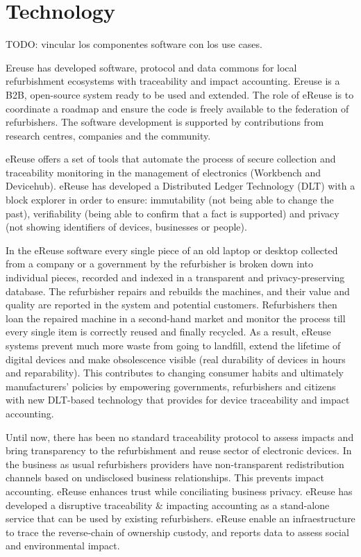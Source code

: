 \documentclass[
]{book}
\begin{document}
\hypertarget{technology}{%
\chapter{Technology}\label{technology}}

TODO: vincular los componentes software con los use cases.

Ereuse has developed software, protocol and data commons for local refurbishment ecosystems with traceability and impact accounting. Ereuse is a B2B, open-source system ready to be used and extended. The role of eReuse is to coordinate a roadmap and ensure the code is freely available to the federation of refurbishers. The software development is supported by contributions from research centres, companies and the community.

eReuse offers a set of tools that automate the process of secure collection and traceability monitoring in the management of electronics (Workbench and Devicehub). eReuse has developed a Distributed Ledger Technology (DLT) with a block explorer in order to ensure: immutability (not being able to change the past), verifiability (being able to confirm that a fact is supported) and privacy (not showing identifiers of devices, businesses or people).

In the eReuse software every single piece of an old laptop or desktop collected from a company or a government by the refurbisher is broken down into individual pieces, recorded and indexed in a transparent and privacy-preserving database. The refurbisher repairs and rebuilds the machines, and their value and quality are reported in the system and potential customers. Refurbishers then loan the repaired machine in a second-hand market and monitor the process till every single item is correctly reused and finally recycled. As a result, eReuse systems prevent much more waste from going to landfill, extend the lifetime of digital devices and make obsolescence visible (real durability of devices in hours and reparability). This contributes to changing consumer habits and ultimately manufacturers' policies by empowering governments, refurbishers and citizens with new DLT-based technology that provides for device traceability and impact accounting.

Until now, there has been no standard traceability protocol to assess impacts and bring transparency to the refurbishment and reuse sector of electronic devices. In the business as usual refurbishers providers have non-transparent redistribution channels based on undisclosed business relationships. This prevents impact accounting. eReuse enhances trust while conciliating business privacy. eReuse has developed a disruptive traceability \& impacting accounting as a stand-alone service that can be used by existing refurbishers. eReuse enable an infraestructure to trace the reverse-chain of ownership custody, and reports data to assess social and environmental impact.
\end{document}
